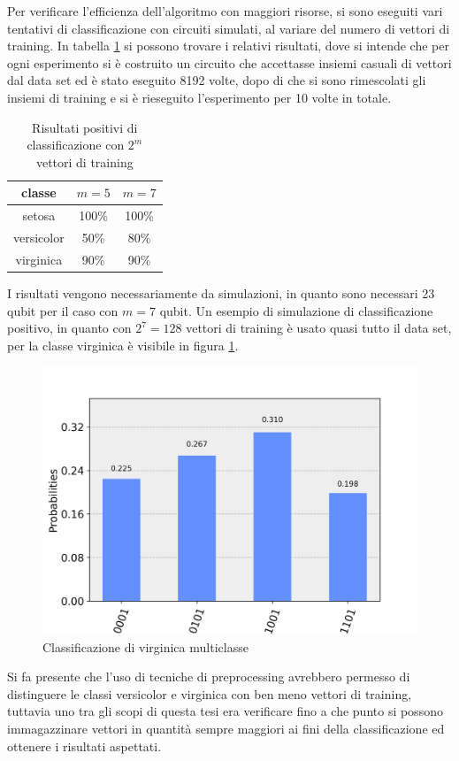 Per verificare l'efficienza dell'algoritmo con maggiori risorse, si sono eseguiti 
vari tentativi di classificazione con circuiti simulati, al variare del numero di 
vettori di training. In tabella \ref{table:misure} si possono trovare i relativi 
risultati, dove si intende che per ogni esperimento si è costruito un circuito 
che accettasse insiemi casuali di vettori dal data set ed è stato eseguito 8192 
volte, dopo di che si sono rimescolati gli insiemi di training e si è rieseguito 
l'esperimento per 10 volte in totale. 

\begin{table}[h!]
    \centering
    \begin{tabular}{c c c}
        classe & $m=5$ & $m=7$ \\ 
        \hline
        setosa & 100\% & 100\%\\ 
        versicolor & 50\% & 80\%\\ 
        virginica & 90\% & 90\%
    \end{tabular}
    \caption{Risultati positivi di classificazione con $2^m$ vettori di training}
    \label{table:misure}
\end{table}

I risultati vengono necessariamente da simulazioni, in quanto sono necessari 
23 qubit per il caso con $m=7$ qubit. Un esempio di simulazione di classificazione 
positivo, in quanto con $2^7=128$ vettori di training è usato quasi tutto il data set, 
per la classe virginica è visibile in figura \ref{fig:multiclasse}. 

\begin{figure}[h!]
    \centering
    \includegraphics[width=\linewidth]{gfx/multiclass_virginica}
    \caption{Classificazione di virginica multiclasse}
    \label{fig:multiclasse}
\end{figure}

Si fa presente che l'uso di tecniche di preprocessing avrebbero permesso di 
distinguere le classi versicolor e virginica con ben meno vettori di training, 
tuttavia uno tra gli scopi di questa tesi era verificare fino a che punto si possono 
immagazzinare vettori in quantità sempre maggiori ai fini della classificazione 
ed ottenere i risultati aspettati. 
